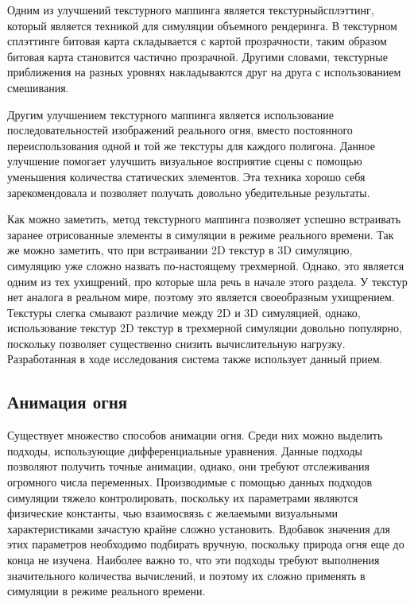 Одним из улучшений текстурного маппинга является текстурный\break{}сплэттинг, который
является техникой для симуляции объемного рендеринга. В текстурном сплэттинге
битовая карта складывается с картой прозрачности, таким образом битовая карта
становится частично прозрачной. Другими словами, текстурные приближения на
разных уровнях накладываются друг на друга с использованием смешивания.

Другим улучшением текстурного маппинга является использование
последовательностей изображений реального огня, вместо постоянного
переиспользования одной и той же текстуры для каждого полигона. Данное улучшение
помогает улучшить визуальное восприятие сцены с помощью уменьшения количества
статических элементов. Эта техника хорошо себя зарекомендовала и позволяет
получать довольно убедительные результаты.

Как можно заметить, метод текстурного маппинга позволяет успешно встраивать
заранее отрисованные элементы в симуляции в режиме реального времени. Так же
можно заметить, что при встраивании 2D текстур в 3D симуляцию, симуляцию уже
сложно назвать по-настоящему трехмерной. Однако, это является одним из тех
ухищрений, про которые шла речь в начале этого раздела. У текстур нет аналога в
реальном мире, поэтому это является своеобразным ухищрением. Текстуры слегка
смывают различие между 2D и 3D симуляцией, однако, использование текстур 2D
текстур в трехмерной симуляции довольно популярно, поскольку позволяет
существенно снизить вычислительную нагрузку. Разработанная в ходе исследования
система также использует данный прием.

\subsection{Анимация огня}

Существует множество способов анимации огня. Среди них можно выделить подходы,
использующие дифференциальные уравнения. Данные подходы позволяют получить
точные анимации, однако, они требуют отслеживания огромного числа переменных.
Производимые с помощью данных подходов симуляции тяжело контролировать,
поскольку их параметрами являются физические константы, чью взаимосвязь с
желаемыми визуальными характеристиками зачастую крайне сложно установить.
Вдобавок значения для этих параметров необходимо подбирать вручную, поскольку
природа огня еще до конца не изучена. Наиболее важно то, что эти подходы требуют
выполнения значительного количества вычислений, и поэтому их сложно применять в
симуляции в режиме реального времени.

